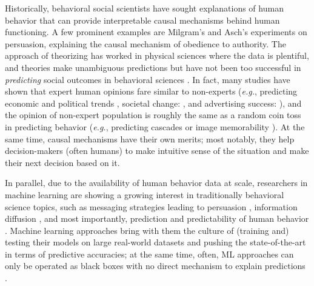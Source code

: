 \documentclass[PhD]{iiitd}
\renewcommand{\cite}[1]{\citep{#1}}
\begin{document}
Historically, behavioral social scientists have sought explanations of human behavior that can provide interpretable causal mechanisms behind human functioning. A few prominent examples are Milgram's \cite{milgram1978obedience} and Asch's \cite{asch1948doctrine} experiments on persuasion, explaining the causal mechanism of obedience to authority. The approach of theorizing has worked in physical sciences where the data is plentiful, and theories make unambiguous predictions but have not been too successful in \textit{predicting} social outcomes in behavioral sciences \cite{open2015estimating,tetlock2017expert,forecasting2023insights}. In fact, many studies have shown that expert human opinions fare similar to non-experts (\textit{e.g.}, predicting economic and political trends \cite{tetlock2017expert}, societal change: \cite{forecasting2023insights}, and advertising success: \cite{singh2024measuring}), and the opinion of non-expert population is roughly the same as a random coin toss in predicting behavior (\textit{e.g.}, predicting cascades \cite{tan2014effect} or image memorability \cite{isola2013makes}). At the same time, causal mechanisms have their own merits; most notably, they help decision-makers (often humans) to make intuitive sense of the situation and make their next decision based on it. 


In parallel, due to the availability of human behavior data at scale, researchers in machine learning are showing a growing interest in traditionally behavioral science topics, such as messaging strategies leading to persuasion \cite{habernal2016makes,kumar2023persuasion,luu2019measuring,bhattacharya2023video}, information diffusion \cite{cheng2014can,martin2016exploring}, and most importantly, prediction and predictability of human behavior \cite{choi2012predicting,song2010limits}. Machine learning approaches bring with them the culture of (training and) testing their models on large real-world datasets and pushing the state-of-the-art in terms of predictive accuracies; at the same time, often, ML approaches can only be operated as black boxes with no direct mechanism to explain predictions \cite{salganik2019bit,singla2022audio}.
\end{document}
